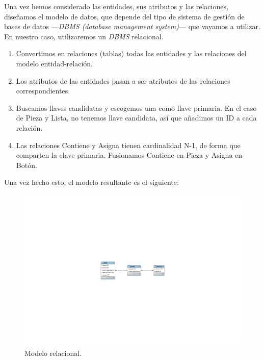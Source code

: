 Una vez hemos considerado las entidades, sus atributos y las relaciones, diseñamos el modelo de datos, que depende del tipo de sistema de gestión de bases de datos ---\textit{DBMS (database management system)}--- que vayamos a utilizar. En nuestro caso, utilizaremos un \textit{DBMS} relacional.

\begin{enumerate}
	\item Convertimos en relaciones (tablas) todas las entidades y las relaciones del modelo entidad-relación.
	\item Los atributos de las entidades pasan a ser atributos de las relaciones correspondientes.
	\item Buscamos llaves candidatas y escogemos una como llave primaria. En el caso de Pieza y Lista, no tenemos llave candidata, así que añadimos un ID a cada relación.
	\item Las relaciones Contiene y Asigna tienen cardinalidad N-1, de forma que comparten la clave primaria. Fusionamos Contiene en Pieza y Asigna en Botón.
\end{enumerate}

Una vez hecho esto, el modelo resultante es el siguiente:

\smallskip

\begin{figure}[H]
	\noindent \begin{centering}
		\includegraphics[clip=true, trim=390 340 390 340, width=\linewidth*3/4]{capitulo4/bd_rel}
		\par\end{centering}
	\smallskip
	\caption{\label{fig:bd_rel} Modelo relacional.}
\end{figure} 

